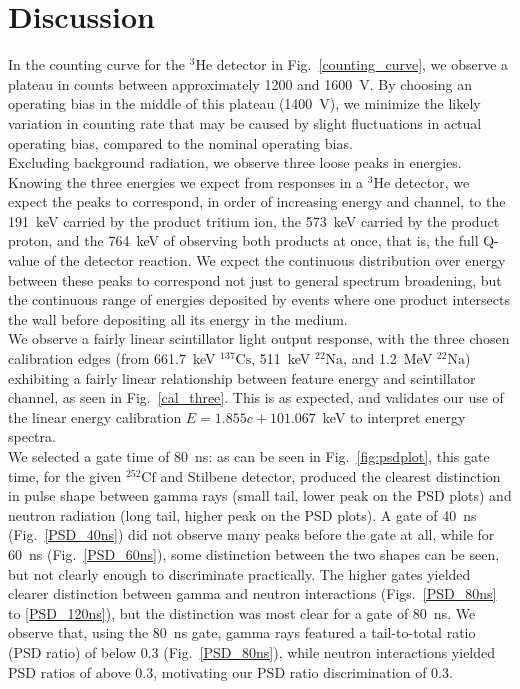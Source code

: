 \documentclass[12pt]{article}
\newcommand{\figref}[1]{Fig.~\ref{#1}}
\newcommand{\CsSrc}{$\mathrm{^{137}Cs}$\xspace}
\newcommand{\NaSrc}{$\mathrm{^{22}Na}$\xspace}
\newcommand{\CfSrc}{$\mathrm{^{252}Cf}$\xspace}
\newcommand{\HeThree}{$\mathrm{^3He}$\xspace}
\begin{document}
\FloatBarrier
\section{Discussion}\label{sec:disc}
In the counting curve for the \HeThree detector in \figref{counting_curve}, we observe a plateau in counts between approximately 1200 and 1600~V.
By choosing an operating bias in the middle of this plateau (1400~V), we minimize the likely variation in counting rate that may be caused by slight fluctuations in actual operating bias, compared to the nominal operating bias.\\

Excluding background radiation, we observe three loose peaks in energies.
Knowing the three energies we expect from responses in a \HeThree detector, we expect the peaks to correspond, in order of increasing energy and channel, to the 191~keV carried by the product tritium ion, the 573~keV carried by the product proton, and the 764~keV of observing both products at once, that is, the full Q-value of the detector reaction.
We expect the continuous distribution over energy between these peaks to correspond not just to general spectrum broadening, but the continuous range of energies deposited by events where one product intersects the wall before depositing all its energy in the medium.\\


We observe a fairly linear scintillator light output response, with the three chosen calibration edges (from 661.7~keV \CsSrc, 511~keV \NaSrc, and 1.2~MeV \NaSrc) exhibiting a fairly linear relationship between feature energy and scintillator channel, as seen in \figref{cal_three}.
This is as expected, and validates our use of the linear energy calibration $E=1.855c + 101.067$~keV to interpret energy spectra.\\

We selected a gate time of 80~ns: as can be seen in \figref{fig:psdplot}, this gate time, for the given \CfSrc and Stilbene detector, produced the clearest distinction in pulse shape between gamma rays (small tail, lower peak on the PSD plots) and neutron radiation (long tail, higher peak on the PSD plots).
A gate of 40~ns (\figref{PSD_40ns}) did not observe many peaks before the gate at all, while for 60~ns (\figref{PSD_60ns}), some distinction between the two shapes can be seen, but not clearly enough to discriminate practically.
The higher gates yielded clearer distinction between gamma and neutron interactions (Figs.~\ref{PSD_80ns} to \ref{PSD_120ns}), but the distinction was most clear for a gate of 80~ns.
We observe that, using the 80~ns gate, gamma rays featured a tail-to-total ratio (PSD ratio) of below 0.3 (\figref{PSD_80ns}), while neutron interactions yielded PSD ratios of above 0.3, motivating our PSD ratio discrimination of 0.3.\\
\end{document}
